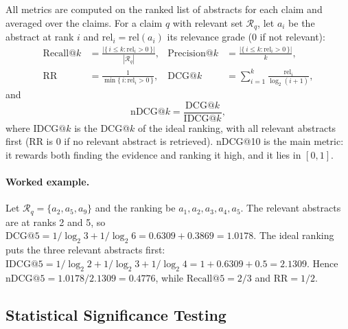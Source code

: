 All metrics are computed on the ranked list of abstracts for each claim and averaged over the
claims. For a claim $q$ with relevant set $\mathcal{R}_q$, let $a_i$ be the abstract at rank $i$
and $\mathrm{rel}_i = \mathrm{rel}(a_i)$ its relevance grade (0 if not relevant):
\begin{align}
\mathrm{Recall@}k &= \frac{\bigl|\{\, i \le k : \mathrm{rel}_i > 0 \,\}\bigr|}{|\mathcal{R}_q|},
&
\mathrm{Precision@}k &= \frac{\bigl|\{\, i \le k : \mathrm{rel}_i > 0 \,\}\bigr|}{k},
\label{eq:recall}\\
\mathrm{RR} &= \frac{1}{\min\{\, i : \mathrm{rel}_i > 0 \,\}},
&
\mathrm{DCG@}k &= \sum_{i=1}^{k} \frac{\mathrm{rel}_i}{\log_2(i + 1)},
\label{eq:dcg}
\end{align}
and
\begin{equation}
\mathrm{nDCG@}k = \frac{\mathrm{DCG@}k}{\mathrm{IDCG@}k},
\label{eq:ndcg}
\end{equation}
where $\mathrm{IDCG@}k$ is the DCG@$k$ of the ideal ranking, with all relevant abstracts first
(RR is 0 if no relevant abstract is retrieved). nDCG@10 \parencite{jarvelin2002ndcg} is the main
metric: it rewards both finding the evidence and ranking it high, and it lies in $[0, 1]$.

\paragraph{Worked example.} Let $\mathcal{R}_q = \{a_2, a_5, a_9\}$ and the ranking be
$a_1, a_2, a_3, a_4, a_5$. The relevant abstracts are at ranks 2 and 5, so
$\mathrm{DCG@}5 = 1/\log_2 3 + 1/\log_2 6 = 0.6309 + 0.3869 = 1.0178$. The ideal ranking puts the
three relevant abstracts first:
$\mathrm{IDCG@}5 = 1/\log_2 2 + 1/\log_2 3 + 1/\log_2 4 = 1 + 0.6309 + 0.5 = 2.1309$. Hence
$\mathrm{nDCG@}5 = 1.0178 / 2.1309 = 0.4776$, while $\mathrm{Recall@}5 = 2/3$ and
$\mathrm{RR} = 1/2$.

\subsection{Statistical Significance Testing}
\label{sec:bootstrap}

